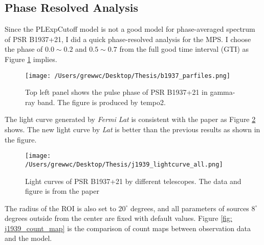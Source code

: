\documentclass[12pt]{report}
\begin{document}


          \subsection{Phase Resolved Analysis}
            Since the PLExpCutoff model is not a good model for phase-averaged spectrum of 
            PSR B1937+21, I did a quick phase-resolved analysis for the MPS. I choose the 
            phase of $0.0 \sim 0.2$ and $0.5 \sim 0.7$ from the full good time interval (GTI) as 
            Figure \ref{fig: j1939_phase} implies. 
            \begin{figure}[!htp]
              \centering 
              \texttt{[image: /Users/grewwc/Desktop/Thesis/b1937\_parfiles.png]}
              \caption{Top left panel shows the pulse phase of PSR B1937+21 in gamma-ray band. 
                The figure is produced by tempo2.}
              \label{fig: j1939_phase}
            \end{figure}
            The light curve generated by \textit{Fermi Lat} is consistent with the paper 
            \cite{J1939_old} as Figure \ref{fig: j1939_light_curve_compare} shows. 
            The new light curve by \textit{Lat} is better than the previous results as shown
            in the figure. 
            \begin{figure}
              \centering 
              \texttt{[image: /Users/grewwc/Desktop/Thesis/j1939\_lightcurve\_all.png]}
              \caption{Light curves of PSR B1937+21 by different telescopes. The data and figure
                is from the paper \cite{J1939_old}}
              \label{fig: j1939_light_curve_compare}
            \end{figure}


            The radius of the ROI is also set to $20^{\circ}$ degrees, and all parameters of 
            sources $8^{\circ}$ degrees outside from the center are fixed with default values. 
            Figure \ref{fig: j1939_count_map} is the comparison of count maps between 
            observation data and the model.
\end{document}
